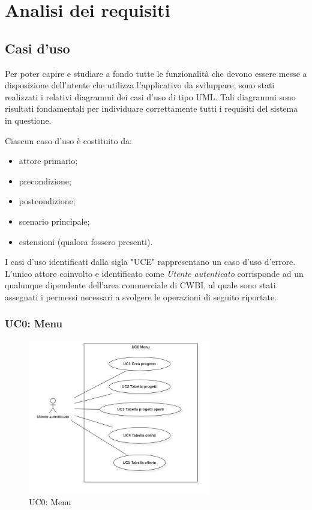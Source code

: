 \chapter{Analisi dei requisiti}
\label{cap:analisi-requisiti}


\setlength{\parskip}{3ex}

\section{Casi d'uso}
Per poter capire e studiare a fondo tutte le funzionalità che devono essere messe a disposizione dell'utente che utilizza l'applicativo da sviluppare, sono stati realizzati i relativi diagrammi dei casi d'uso di tipo UML. Tali diagrammi sono risultati fondamentali per individuare correttamente tutti i requisiti del sistema in questione.

\setlength{\parskip}{3ex}

\noindent Ciascun caso d'uso è costituito da:
\begin{itemize}
\item attore primario;
\item precondizione;
\item postcondizione;
\item scenario principale;
\item estensioni (qualora fossero presenti).
\end{itemize}

\setlength{\parskip}{3ex}

\noindent I casi d'uso identificati dalla sigla "UCE" rappresentano un caso d'uso d'errore.
L'unico attore coinvolto e identificato come \textit{Utente autenticato} corrisponde ad un qualunque dipendente dell'area commerciale di CWBI, al quale sono stati assegnati i permessi necessari a svolgere le operazioni di seguito riportate.  

\pagebreak

\subsection{UC0: Menu}
\begin{figure}[!h]
\centering
\includegraphics[width=300px]{../images/UC/.jpeg/UC0-menu.jpg}
\caption{UC0: Menu}
\end{figure}

